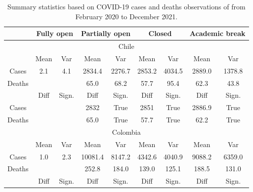 \documentclass{article}
\begin{document}
\begin{table}[]
\caption{Summary statistics based on COVID-19 cases and deaths observations of from February 2020 to December 2021. }
\begin{tabular}{ccccccccc}

\hline
       & \multicolumn{2}{c}{Fully open} & \multicolumn{2}{c}{Partially open} & \multicolumn{2}{c}{Closed} & \multicolumn{2}{c}{Academic break} \\ \hline
\multicolumn{9}{c}{Chile}                                                                                                                      \\ \hline
       & Mean         & Var        & Mean           & Var          & Mean      & Var       & Mean           & Var          \\ \hline
Cases  & 2.1          & 4.1             & 2834.4         & 2276.7            & 2853.2    & 4034.5         & 2889.0         & 1378.8            \\
Deaths &              &                 & 65.0           & 68.2              & 57.7      & 95.4           & 62.3           & 43.8              \\ \hline
       & Diff         & Sign.           & Diff           & Sign.       & Diff      & Sign.    & Diff           & Sign.       \\ \hline
Cases  &              &                 & 2832           & True             & 2851      & True           & 2886.9         & True              \\
Deaths &              &                 & 65.0           & True             & 57.7      & True           & 62.2           & True            \\ \hline
\multicolumn{9}{c}{Colombia}                                                                                                                   \\ \hline
       & Mean         & Var        & Mean           & Var          & Mean      & Var       & Mean           & Var          \\ \hline
Cases  & 1.0          & 2.3             & 10081.4        & 8147.2            & 4342.6    & 4040.9         & 9088.2         & 6359.0            \\
Deaths &              &                 & 252.8          & 184.0             & 139.0     & 125.1          & 188.5          & 131.0             \\ \hline
       & Diff         & Sign.           & Diff           & Sign.       & Diff      & Sign.    & Diff           & Sign.       \\ \hline

\end{tabular}
\end{table}
\end{document}
